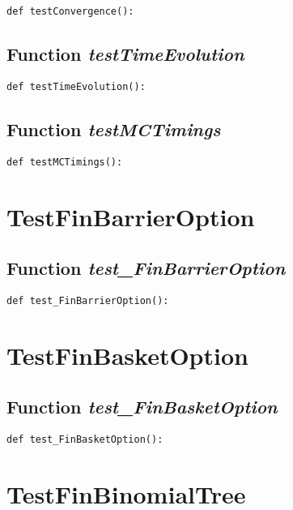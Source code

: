 \documentclass[twoside,11pt]{book}
\begin{document}
\begin{lstlisting}
def testConvergence():
\end{lstlisting}

\subsection{Function {\it testTimeEvolution}}


\begin{lstlisting}
def testTimeEvolution():
\end{lstlisting}

\subsection{Function {\it testMCTimings}}


\begin{lstlisting}
def testMCTimings():
\end{lstlisting}


\newpage
\section{TestFinBarrierOption}

\subsection{Function {\it test\_FinBarrierOption}}


\begin{lstlisting}
def test_FinBarrierOption():
\end{lstlisting}


\newpage
\section{TestFinBasketOption}

\subsection{Function {\it test\_FinBasketOption}}


\begin{lstlisting}
def test_FinBasketOption():
\end{lstlisting}


\newpage
\section{TestFinBinomialTree}
\end{document}

